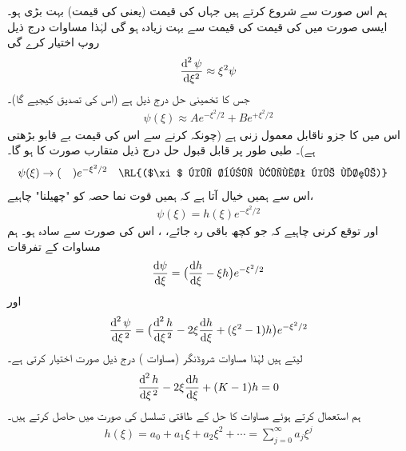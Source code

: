 ہم اس صورت سے شروع کرتے ہیں جہاں  کی قیمت (یعنی  کی قیمت) بہت بڑی ہو۔ ایسی صورت میں
 کی قیمت  کی قیمت سے بہت زیادہ ہو گی لہٰذا مساوات  درج ذیل روپ اختیار کرے گی
\begin{align}
\frac{\dif^{\,2}\psi}{\dif \xi^{2}}\approx \xi^{2}\psi
\end{align}
جس کا تخمینی حل درج ذیل ہے (اس کی تصدیق کیجیے گا)۔ 
\begin{align}\label{مساوات_غیر_تابع_وقت_متقارب_حل}
\psi(\xi)\approx Ae^{-\xi^{2}/2}+Be^{+\xi^{2}/2}
\end{align}
 اس میں  کا جزو   ناقابل  معمول زنی  ہے (چونکہ  کرنے سے اس کی قیمت بے قابو بڑھتی ہے)۔ طبی طور پر قابل قبول حل درج ذیل متقارب صورت کا ہو گا۔
\begin{align}
\psi(\xi)&\to(\quad )e^{-\xi^{2}/2}&&\text{\RL{($\xi$ کی بڑی قیمت کے لئے)}}
\end{align}
اس سے ہمیں خیال آتا ہے کہ ہمیں قوت نما حصہ کو "چھیلنا" چاہیے،
\begin{align}\label{مساوات_شروڈنگر_متقارب_الف}
\psi(\xi)=h(\xi)e^{-\xi^{2}/2}
\end{align}
اور توقع کرنی چاہیے کہ جو کچھ باقی رہ جائے، ، اس کی صورت  سے سادہ ہو۔ ہم مساوات  کے تفرقات
\begin{align*}
\frac{\dif{\psi}}{\dif{\xi}}=\big(\frac{\dif{h}}{\dif{\xi}}-\xi h\big )e^{-\xi^{2}/2}
\end{align*}
اور
\begin{align*}
\frac{\dif^{\,2}{\psi}}{\dif{\xi^{\,2}}}=\big (\frac{\dif^{\,2}{h}}{\dif{\xi^{\,2}}}-2\xi\frac{\dif{h}}{\dif{\xi}}+(\xi^{2}-1)h\big )e^{-\xi^{2}/2}
\end{align*}
 لیتے ہیں لہٰذا مساوات شروڈنگر (مساوات ) درج ذیل صورت اختیار کرتی ہے۔
\begin{align}\label{مساوات_شروڈنگر_فروبنیوس_الف}
\frac{\dif^{\,2}{h}}{\dif{\xi^{\,2}}}-2\xi\frac{\dif{h}}{\dif{\xi}}+(K-1)h=0
\end{align}
ہم  استعمال کرتے ہوئے مساوات  کا حل  کے طاقتی تسلسل کی صورت میں حاصل کرتے ہیں۔ 
\begin{align}
h(\xi)=a_{0}+a_{1}\xi+a_{2}\xi^{2}+\cdots = \sum_{j=0}^{\infty}a_{j}\xi^{j}
\end{align}
